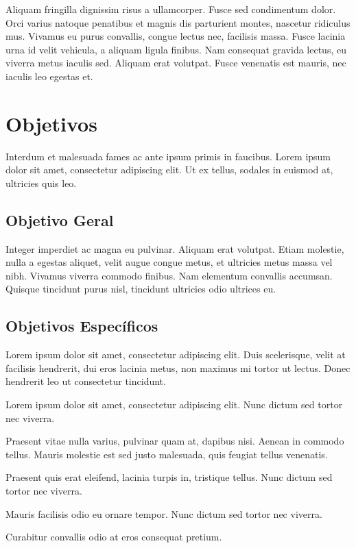 Aliquam fringilla dignissim risus a ullamcorper. Fusce sed condimentum dolor. Orci varius natoque penatibus et magnis dis parturient montes, nascetur ridiculus mus. Vivamus eu purus convallis, congue lectus nec, facilisis massa. Fusce lacinia urna id velit vehicula, a aliquam ligula finibus. Nam consequat gravida lectus, eu viverra metus iaculis sed. Aliquam erat volutpat. Fusce venenatis est mauris, nec iaculis leo egestas et.

\section{Objetivos}
\label{sec:objetivos}

Interdum et malesuada fames ac ante ipsum primis in faucibus. Lorem ipsum dolor sit amet, consectetur adipiscing elit. Ut ex tellus, sodales in euismod at, ultricies quis leo.

\subsection{Objetivo Geral}
\label{sec:objetivo-geral}

Integer imperdiet ac magna eu pulvinar. Aliquam erat volutpat. Etiam molestie, nulla a egestas aliquet, velit augue congue metus, et ultricies metus massa vel nibh. Vivamus viverra commodo finibus. Nam elementum convallis accumsan. Quisque tincidunt purus nisl, tincidunt ultricies odio ultrices eu.

\subsection{Objetivos Específicos}
\label{sec:objetivos-especificos}

Lorem ipsum dolor sit amet, consectetur adipiscing elit. Duis scelerisque, velit at facilisis hendrerit, dui eros lacinia metus, non maximus mi tortor ut lectus. Donec hendrerit leo ut consectetur tincidunt. 

	\begin{alineas}
		\item Lorem ipsum dolor sit amet, consectetur adipiscing elit. Nunc dictum sed tortor nec viverra.
		\item Praesent vitae nulla varius, pulvinar quam at, dapibus nisi. Aenean in commodo tellus. Mauris molestie est sed justo malesuada, quis feugiat tellus venenatis.
		\item Praesent quis erat eleifend, lacinia turpis in, tristique tellus. Nunc dictum sed tortor nec viverra.
		\item Mauris facilisis odio eu ornare tempor. Nunc dictum sed tortor nec viverra.
		\item Curabitur convallis odio at eros consequat pretium.
	\end{alineas}